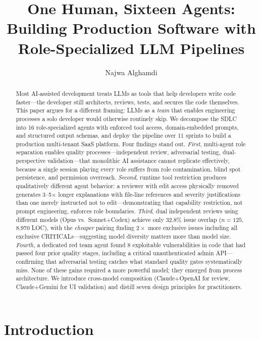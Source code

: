 \documentclass[a4paper,USenglish,cleveref,autoref]{lipics-v2021}
\title{One Human, Sixteen Agents: Building Production Software with Role-Specialized LLM Pipelines}
\author{Najwa Alghamdi}{Independent Researcher / Founder \\ \url{https://najwa.io}}{Research@Najwa.io}{}{}
\begin{document}
\maketitle

\begin{abstract}
Most AI-assisted development treats LLMs as tools that help developers write code faster---the developer still architects, reviews, tests, and secures the code themselves. This paper argues for a different framing: LLMs as a \emph{team} that enables engineering processes a solo developer would otherwise routinely skip. We decompose the SDLC into 16 role-specialized agents with enforced tool access, domain-embedded prompts, and structured output schemas, and deploy the pipeline over 11 sprints to build a production multi-tenant SaaS platform. Four findings stand out. \emph{First}, multi-agent role separation enables quality processes---independent review, adversarial testing, dual-perspective validation---that monolithic AI assistance cannot replicate effectively, because a single session playing every role suffers from role contamination, blind spot persistence, and permission overreach. \emph{Second}, runtime tool restriction produces qualitatively different agent behavior: a reviewer with edit access physically removed generates 3--5$\times$ longer explanations with file-line references and severity justifications than one merely instructed not to edit---demonstrating that capability restriction, not prompt engineering, enforces role boundaries. \emph{Third}, dual independent reviews using different models (Opus vs.\ Sonnet+Codex) achieve only 32.8\% issue overlap ($n=125$, 8{,}970 LOC), with the \emph{cheaper} pairing finding $2\times$ more exclusive issues including all exclusive CRITICALs---suggesting model diversity matters more than model size. \emph{Fourth}, a dedicated red team agent found 8 exploitable vulnerabilities in code that had passed four prior quality stages, including a critical unauthenticated admin API---confirming that adversarial testing catches what standard quality gates systematically miss. None of these gains required a more powerful model; they emerged from process architecture. We introduce cross-model composition (Claude+OpenAI for review, Claude+Gemini for UI validation) and distill seven design principles for practitioners.
\end{abstract}

\section{Introduction}
\label{sec:intro}
\end{document}
